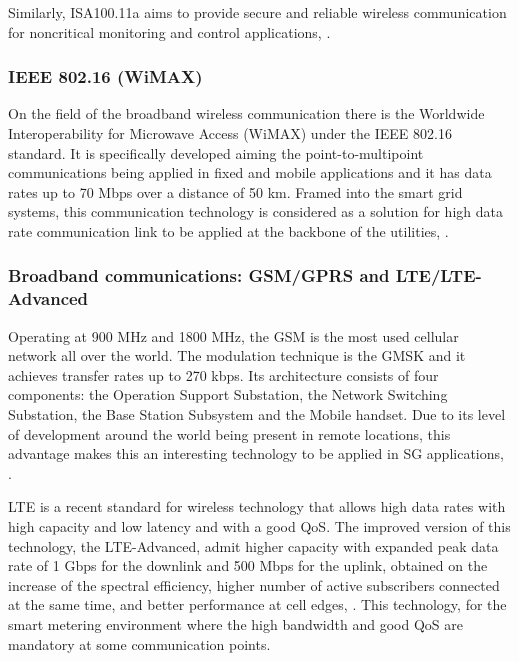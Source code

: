 Similarly, ISA100.11a aims to provide secure and reliable wireless communication for noncritical monitoring and control applications, \cite{Petersen2011}.





\subsubsection{IEEE 802.16 (WiMAX)}

On the field of the broadband wireless communication there is the Worldwide Interoperability for Microwave Access (WiMAX) under the IEEE 802.16 standard. It is specifically developed aiming the point-to-multipoint communications being applied in fixed and mobile applications and it has data rates up to 70 Mbps over a distance of 50 km. Framed into the smart grid systems, this communication technology is considered as a solution for high data rate communication link to be applied at the backbone of the utilities, \cite{Usman2013}.


\subsubsection{Broadband communications: GSM/GPRS and LTE/LTE-Advanced}

Operating at 900 MHz and 1800 MHz, the \ac{GSM} is the most used cellular network all over the world. The modulation technique is the \ac{GMSK} and it achieves transfer rates up to 270 kbps. Its architecture consists of four components: the Operation Support Substation, the Network Switching Substation, the Base Station Subsystem and the Mobile handset. Due to its level of development around the world being present in remote locations, this advantage makes this an interesting technology to be applied in \ac{SG} applications, \cite{Usman2013}.

\ac{LTE} is a recent standard for wireless technology that allows high data rates with high capacity and low latency and with a good \ac{QoS}. The improved version of this technology, the LTE-Advanced, admit higher capacity with expanded peak data rate of 1 Gbps for the downlink and 500 Mbps for the uplink, obtained on the increase of the spectral efficiency, higher  number of active subscribers connected at the same time, and better performance at cell edges, \cite{Mohassel2014}. This technology, for the smart metering environment where the high bandwidth and good \ac{QoS} are mandatory at some communication points.


